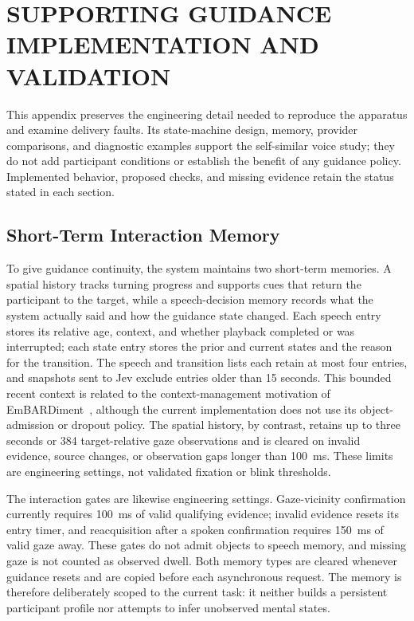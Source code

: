 \chapter{SUPPORTING GUIDANCE IMPLEMENTATION AND VALIDATION}
\label{app:guidance-support}
This appendix preserves the engineering detail needed to reproduce the apparatus and examine delivery faults. Its state-machine design, memory, provider comparisons, and diagnostic examples support the self-similar voice study; they do not add participant conditions or establish the benefit of any guidance policy. Implemented behavior, proposed checks, and missing evidence retain the status stated in each section.

\section{Short-Term Interaction Memory}
To give guidance continuity, the system maintains two short-term memories. A spatial history tracks turning progress and supports cues that return the participant to the target, while a speech-decision memory records what the system actually said and how the guidance state changed. Each speech entry stores its relative age, context, and whether playback completed or was interrupted; each state entry stores the prior and current states and the reason for the transition. The speech and transition lists each retain at most four entries, and snapshots sent to Jev exclude entries older than 15 seconds. This bounded recent context is related to the context-management motivation of EmBARDiment~\cite{bovo2025embardiment}, although the current implementation does not use its object-admission or dropout policy. The spatial history, by contrast, retains up to three seconds or 384 target-relative gaze observations and is cleared on invalid evidence, source changes, or observation gaps longer than 100~ms. These limits are engineering settings, not validated fixation or blink thresholds.

The interaction gates are likewise engineering settings. Gaze-vicinity confirmation currently requires 100~ms of valid qualifying evidence; invalid evidence resets its entry timer, and reacquisition after a spoken confirmation requires 150~ms of valid gaze away. These gates do not admit objects to speech memory, and missing gaze is not counted as observed dwell. Both memory types are cleared whenever guidance resets and are copied before each asynchronous request. The memory is therefore deliberately scoped to the current task: it neither builds a persistent participant profile nor attempts to infer unobserved mental states.

